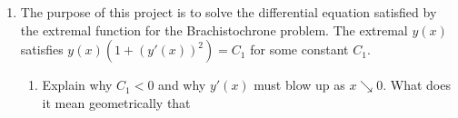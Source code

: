 \documentclass{article}
\begin{document}
\begin{enumerate}
\begin{enumerate}
                        $x\in[x_o-\mu,x_o+\mu]$.
                        \medbreak
                        Because $f$ is contained in a finite interval,
                        $\lVert f\rVert_\infty=f(x_o)$. $f$ is also continuous,
                        so there must exist some $\mu$ such that
                        $x_o\pm\mu>\lVert f\rVert_\infty \geq f(x_o)-\varepsilon$.
                  \item Prove that $\int_0^1\lvert f(x)\rvert^pdx \geq
                              2\mu(\lVert f\rVert_\infty-\varepsilon)^p$ for
                        all $p$.
                        \begin{proof}
                              \begin{align*}
                                    \int_0^1\lvert f(x)\rvert^pdx & =
                                    \int_0^1\lvert f(x)\rvert^pdx & \geq 2\mu(\lVert f\rVert_\infty-\varepsilon)^p         \\
                                    \lVert f\rVert_p^p            & \geq 2\mu(\lVert f\rVert_\infty-\varepsilon)^p         \\
                                    \lVert f\rVert_p              & \geq \sqrt[p]{2\mu}(\lVert f\rVert_\infty-\varepsilon) \\
                              \end{align*}
                        \end{proof}
                  \item Show that for $p$ large enough, $\lVert f\rVert_\infty
                              \geq \lVert f\rVert_p \geq \lVert f\rVert_\infty
                              -2\varepsilon$ and conclude that $\lim_{p\to\infty}
                              \lVert f\rVert_p = \lVert f\rVert_\infty$.
            \end{enumerate}
            \setcounter{enumi}{3}
      \item The purpose of this project is to solve the differential equation
            satisfied by the extremal function for the Brachistochrone problem.
            The extremal $y(x)$ satisfies $y(x)(1+(y'(x))^2)=C_1$ for some
            constant $C_1$.
            \begin{enumerate}
                  \item Explain why $C_1<0$ and why $y'(x)$ must blow up as
                        $x\searrow  0$. What does it mean geometrically that

\end{enumerate}
\end{enumerate}
\end{document}
